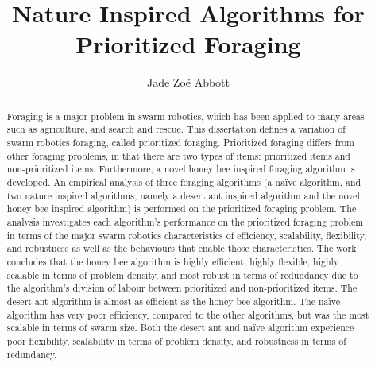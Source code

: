 \documentclass[preprint,12pt]{elsarticle}
\begin{document}
    
    \begin{frontmatter}
    
    
    
    \title{Nature Inspired Algorithms for Prioritized Foraging}
    
    
    \author{Jade Zo\"e Abbott}
    
    \address{}
    
    \begin{abstract}

    Foraging is a major problem in swarm robotics, which has been applied to many areas such as agriculture, and search and rescue. This dissertation defines a variation of swarm robotics foraging, called prioritized foraging. Prioritized foraging differs from other foraging problems, in that there are two types of items: prioritized items and non-prioritized items. Furthermore, a novel honey bee inspired foraging algorithm is developed. An empirical analysis of three foraging algorithms (a na\"ive algorithm, and two nature inspired algorithms, namely a desert ant inspired algorithm and the novel honey bee inspired algorithm) is performed on the prioritized foraging problem. The analysis investigates each algorithm's performance on the prioritized foraging problem in terms of the major swarm robotics characteristics of efficiency, scalability, flexibility, and robustness as well as the behaviours that enable those characteristics. The work concludes that the honey bee algorithm is highly efficient, highly flexible, highly scalable in terms of problem density, and most robust in terms of redundancy due to the algorithm's division of labour between prioritized and non-prioritized items. The desert ant algorithm is almost as efficient as the honey bee algorithm. The na\"ive algorithm has very poor efficiency, compared to the other algorithms, but was the most scalable in terms of swarm size. Both the desert ant and na\"ive algorithm experience poor flexibility, scalability in terms of problem density, and robustness in terms of redundancy.
    \end{abstract}
    

\end{frontmatter}
\end{document}
